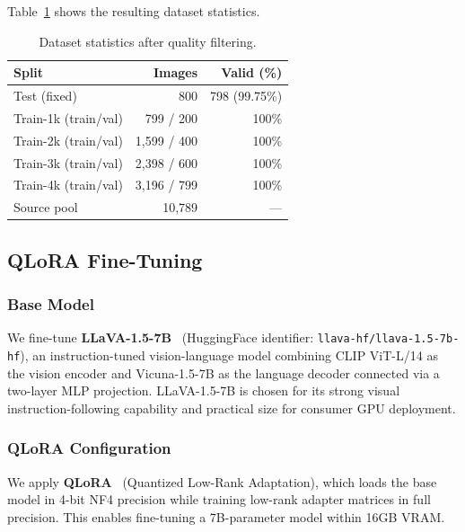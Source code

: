 \documentclass[twocolumn]{article}
\begin{document}
Table~\ref{tab:dataset} shows the resulting dataset statistics.

\begin{table}[h]
\centering
\caption{Dataset statistics after quality filtering.}
\label{tab:dataset}
\begin{tabular}{lrr}
\toprule
\textbf{Split} & \textbf{Images} & \textbf{Valid (\%)} \\
\midrule
Test (fixed)          & 800   & 798 (99.75\%) \\
\midrule
Train-1k (train/val)  & 799 / 200   & 100\% \\
Train-2k (train/val)  & 1{,}599 / 400 & 100\% \\
Train-3k (train/val)  & 2{,}398 / 600 & 100\% \\
Train-4k (train/val)  & 3{,}196 / 799 & 100\% \\
\midrule
Source pool           & 10{,}789 & --- \\
\bottomrule
\end{tabular}
\end{table}

\subsection{QLoRA Fine-Tuning}
\label{sec:finetuning}

\subsubsection{Base Model}

We fine-tune \textbf{LLaVA-1.5-7B}~\cite{liu2024llava} (HuggingFace identifier:
\texttt{llava-hf/llava-1.5-7b-hf}), an instruction-tuned vision-language model
combining CLIP ViT-L/14 as the vision encoder and Vicuna-1.5-7B as the
language decoder connected via a two-layer MLP projection.
LLaVA-1.5-7B is chosen for its strong visual instruction-following capability
and practical size for consumer GPU deployment.

\subsubsection{QLoRA Configuration}

We apply \textbf{QLoRA}~\cite{dettmers2023qlora} (Quantized Low-Rank Adaptation),
which loads the base model in 4-bit NF4 precision while training low-rank adapter
matrices in full precision. This enables fine-tuning a 7B-parameter model within
16GB VRAM.
\end{document}
